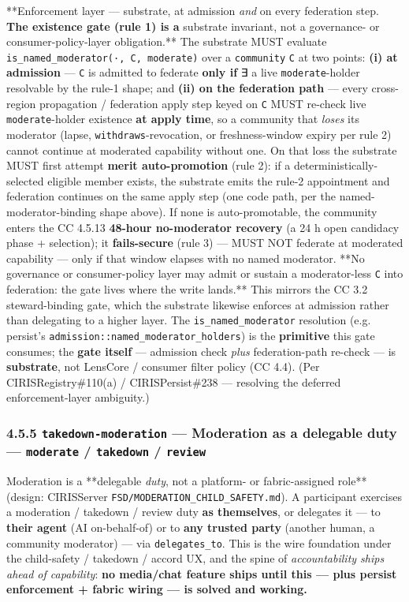 \documentclass[11pt]{article}
\begin{document}
**Enforcement layer — substrate, at admission \textit{and} on every federation step.\textbf{ The existence gate (rule 1) is a }substrate invariant, not a governance- or consumer-policy-layer obligation.** The substrate MUST evaluate \texttt{is\_named\_moderator(·, C, moderate)} over a \texttt{community} \texttt{C} at two points: \textbf{(i) at admission} — \texttt{C} is admitted to federate \textbf{only if} ∃ a live \texttt{moderate}-holder resolvable by the rule-1 shape; and \textbf{(ii) on the federation path} — every cross-region propagation / federation apply step keyed on \texttt{C} MUST re-check live \texttt{moderate}-holder existence \textbf{at apply time}, so a community that \textit{loses} its moderator (lapse, \texttt{withdraws}-revocation, or freshness-window expiry per rule 2) cannot continue at moderated capability without one. On that loss the substrate MUST first attempt \textbf{merit auto-promotion} (rule 2): if a deterministically-selected eligible member exists, the substrate emits the rule-2 appointment and federation continues on the same apply step (one code path, per the named-moderator-binding shape above). If none is auto-promotable, the community enters the CC 4.5.13 \textbf{48-hour no-moderator recovery} (a 24 h open candidacy phase + selection); it \textbf{fails-secure} (rule 3) — MUST NOT federate at moderated capability — only if that window elapses with no named moderator. **No governance or consumer-policy layer may admit or sustain a moderator-less \texttt{C} into federation: the gate lives where the write lands.** This mirrors the CC 3.2 steward-binding gate, which the substrate likewise enforces at admission rather than delegating to a higher layer. The \texttt{is\_named\_moderator} resolution (e.g. persist's \texttt{admission::named\_moderator\_holders}) is the \textbf{primitive} this gate consumes; the \textbf{gate itself} — admission check \textit{plus} federation-path re-check — is \textbf{substrate}, not LensCore / consumer filter policy (CC 4.4). (Per CIRISRegistry\#110(a) / CIRISPersist\#238 — resolving the deferred enforcement-layer ambiguity.)


\subsubsection*{4.5.5 \texttt{takedown-moderation} — Moderation as a delegable duty — \texttt{moderate} / \texttt{takedown} / \texttt{review}}


Moderation is a **delegable \textit{duty}, not a platform- or fabric-assigned role** (design: CIRISServer \texttt{FSD/MODERATION\_CHILD\_SAFETY.md}). A participant exercises a moderation / takedown / review duty \textbf{as themselves}, or delegates it — to \textbf{their agent} (AI on-behalf-of) or to \textbf{any trusted party} (another human, a community moderator) — via \texttt{delegates\_to}. This is the wire foundation under the child-safety / takedown / accord UX, and the spine of \textit{accountability ships ahead of capability}: \textbf{no media/chat feature ships until this — plus persist enforcement + fabric wiring — is solved and working.}
\end{document}
